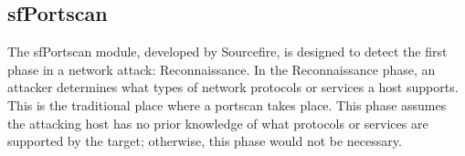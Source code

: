 \documentclass[english]{report}
\begin{document}
%
%
%
%            
%
%
%
%


\subsection{sfPortscan\label{sfportscan section}}

The sfPortscan module, developed by Sourcefire, is designed to detect the 
first phase in a network attack: Reconnaissance. In the Reconnaissance phase, 
an attacker determines
what types of network protocols or services a host supports. This is
the traditional place where a portscan takes place. This phase assumes
the attacking host has no prior knowledge of what protocols or
services are supported by the target; otherwise, this phase would not
be necessary.
\end{document}
